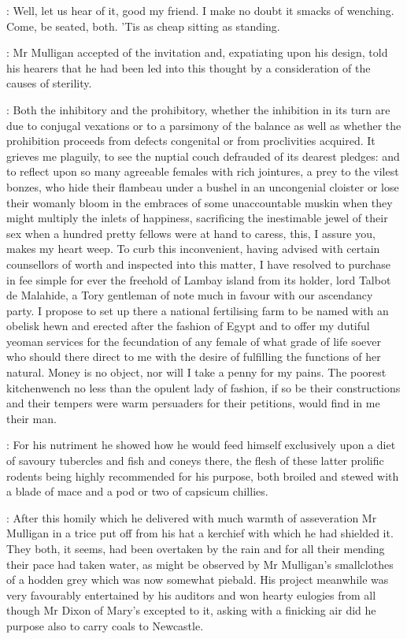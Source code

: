\documentclass[12pt]{article}
\begin{document}
\Dx: Well, let us hear of it, good my friend. I make no doubt it
smacks of wenching. Come, be seated, both. 'Tis as cheap sitting as
standing.

: Mr Mulligan accepted of the invitation and, expatiating upon his
design, told his hearers that he had been led into this thought by a
consideration of the causes of sterility.

\Mu: Both the inhibitory and the prohibitory, whether the inhibition in
its turn are due to conjugal vexations or to a parsimony of the balance as
well as whether the prohibition proceeds from defects congenital or from
proclivities acquired. It grieves me plaguily, to see the nuptial couch
defrauded of its dearest pledges: and to reflect upon so many agreeable
females with rich jointures, a prey to the vilest bonzes, who hide their
flambeau under a bushel in an uncongenial cloister or lose their womanly
bloom in the embraces of some unaccountable muskin when they might
multiply the inlets of happiness, sacrificing the inestimable jewel of
their sex when a hundred pretty fellows were at hand to caress, this, I
assure you, makes my heart weep. To curb this inconvenient, having advised
with certain counsellors of worth and inspected into this matter, I have
resolved to purchase in fee simple for ever the freehold of Lambay island
from its holder, lord Talbot de Malahide, a Tory gentleman of note much in
favour with our ascendancy party. I propose to set up there a national
fertilising farm to be named  with an obelisk hewn and
erected after the fashion of Egypt and to offer my dutiful yeoman services
for the fecundation of any female of what grade of life soever who should
there direct to me with the desire of fulfilling the functions of her
natural. Money is no object, nor will I take a penny for my pains. The
poorest kitchenwench no less than the opulent lady of fashion, if so be
their constructions and their tempers were warm persuaders for their
petitions, would find in me their man.

: For his nutriment he showed how he would feed himself exclusively
upon a diet of savoury tubercles and fish and coneys there, the flesh of
these latter prolific rodents being highly recommended for his purpose,
both broiled and stewed with a blade of mace and a pod or two of capsicum
chillies.

: After this homily which he delivered with much warmth of asseveration
Mr Mulligan in a trice put off from his hat a kerchief with which he had
shielded it. They both, it seems, had been overtaken by the rain and for
all their mending their pace had taken water, as might be observed by Mr
Mulligan's smallclothes of a hodden grey which was now somewhat piebald.
His project meanwhile was very favourably entertained by his auditors and
won hearty eulogies from all though Mr Dixon of Mary's excepted to it,
asking with a finicking air did he purpose also to carry coals to
Newcastle.
\end{document}
